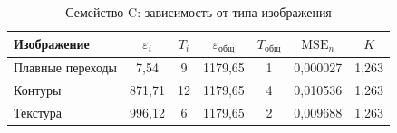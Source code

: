 \begin{table}[H]
\centering
\caption{Семейство C: зависимость от типа изображения}
\label{tab:family-c}
\begin{tabular}{@{}lcccccc@{}}
\hline
Изображение & $\varepsilon_i$ & $T_i$ & $\varepsilon_{\text{общ}}$ & $T_{\text{общ}}$ & $\mathrm{MSE}_n$ & $K$ \\
\hline
Плавные переходы & 7{,}54 & 9 & 1179{,}65 & 1 & 0{,}000027 & 1{,}263 \\
Контуры & 871{,}71 & 12 & 1179{,}65 & 4 & 0{,}010536 & 1{,}263 \\
Текстура & 996{,}12 & 6 & 1179{,}65 & 2 & 0{,}009688 & 1{,}263 \\
\hline
\end{tabular}
\end{table}
